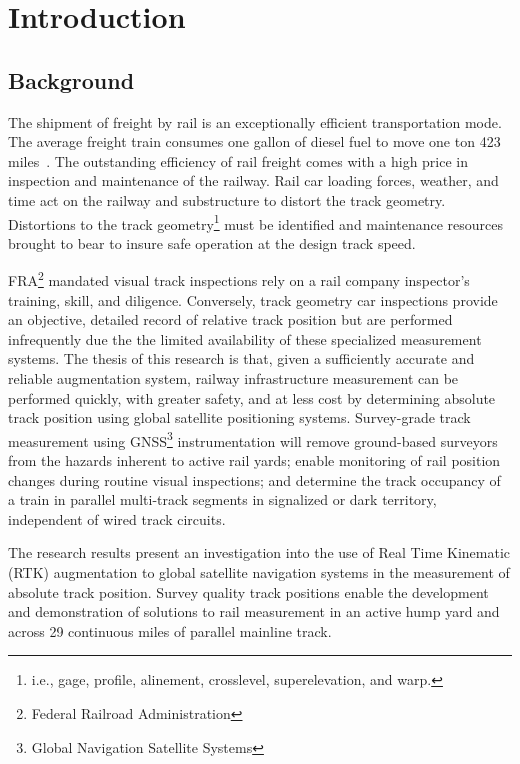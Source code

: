 \chapter{Introduction}
\section{Background}
The shipment of freight by rail is an exceptionally efficient transportation mode. The average freight train consumes one gallon of diesel fuel to move one ton 423 miles~\citep{RITAtransStats08}. The outstanding efficiency of rail freight comes with a high price in inspection and maintenance of the railway. Rail car loading forces, weather, and time act on the railway and substructure to distort the track geometry. Distortions to the track geometry\footnote{i.e., gage, profile, alinement, crosslevel, superelevation, and warp.} must be identified and maintenance resources brought to bear to insure safe operation at the design track speed. 

FRA\footnote{Federal Railroad Administration} mandated visual track inspections rely on a rail company inspector's training, skill, and diligence. Conversely, track geometry car inspections provide an objective, detailed record of relative track position but are performed infrequently due the the limited availability of these specialized measurement systems. The thesis of this research is that, given a sufficiently accurate and reliable augmentation system, railway infrastructure measurement can be performed quickly, with greater safety, and at less cost by determining absolute track position using global satellite positioning systems. Survey-grade track measurement using GNSS\footnote{Global Navigation Satellite Systems} instrumentation will remove ground-based surveyors from the hazards inherent to active rail yards; enable monitoring of rail position changes during routine visual inspections; and determine the track occupancy of a train in parallel multi-track segments in signalized or dark territory, independent of wired track circuits.

The research results present an investigation into the use of Real Time Kinematic (RTK) augmentation to global satellite navigation systems in the measurement of absolute track position. Survey quality track positions enable the development and demonstration of solutions to rail measurement in an active hump yard and across 29 continuous miles of parallel mainline track.

